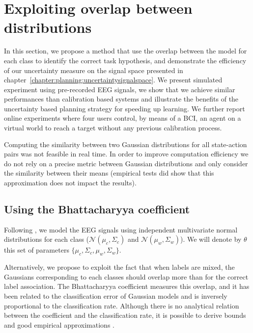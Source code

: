 
\section{Exploiting overlap between distributions}
\label{chapter:limitations:overlap}


In this section, we propose a method that use the overlap between the model for each class to identify the correct task hypothesis, and demonstrate the efficiency of our uncertainty measure on the signal space presented in chapter~\ref{chapter:planning:uncertaintysignalspace}. We present simulated experiment using pre-recorded EEG signals, we show that we achieve similar performances than calibration based systems and illustrate the benefits of the uncertainty based planning strategy for speeding up learning. We further report online experiments where four users control, by means of a BCI, an agent on a virtual world to reach a target without any previous calibration process.

Computing the similarity between two Gaussian distributions for all state-action pairs was not feasible in real time. In order to improve computation efficiency we do not rely on a precise metric between Gaussian distributions and only consider the similarity between their means (empirical tests did show that this approximation does not impact the results).

\subsection{Using the Bhattacharyya coefficient}

Following \cite{blankertz2010single}, we model the EEG signals using independent multivariate normal distributions for each class ($\mathcal{N}(\mu_c, \Sigma_c)$ and $\mathcal{N}(\mu_w, \Sigma_w)$). We will denote by $\theta$ this set of parameters $\{\mu_c, \Sigma_c,\mu_w, \Sigma_w\}$.

Alternatively, we propose to exploit the fact that when labels are mixed, the Gaussians corresponding to each classes should overlap more than for the correct label association. The Bhattacharyya coefficient measures this overlap, and it has been related to the classification error of Gaussian models \cite{Kailath67} and is inversely proportional to the classification rate. Although there is no analytical relation between the coefficient and the classification rate, it is possible to derive bounds and good empirical approximations \cite{lee2000bayes}.

